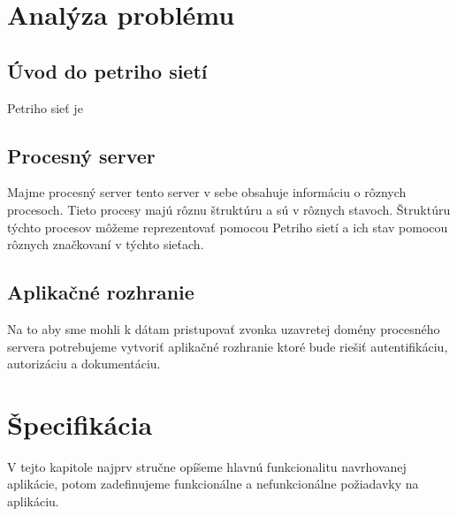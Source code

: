  

  

\section{Analýza problému} 

  

\subsection{Úvod do petriho sietí} %

\noindent Petriho sieť je  


  

  

\subsection{Procesný server} 

\noindent Majme procesný server tento server v sebe obsahuje informáciu o rôznych procesoch. Tieto procesy majú rôznu štruktúru a sú v rôznych stavoch. Štruktúru týchto procesov môžeme reprezentovať pomocou Petriho sietí a ich stav pomocou rôznych značkovaní v týchto sieťach.  


  

\subsection{Aplikačné rozhranie} 

\noindent Na to aby sme mohli k dátam pristupovať zvonka uzavretej domény procesného servera potrebujeme vytvoriť aplikačné rozhranie ktoré bude riešiť autentifikáciu, autorizáciu a dokumentáciu.  


  

  

  

  

\section{Špecifikácia} 

\noindent V tejto kapitole najprv stručne opíšeme hlavnú funkcionalitu navrhovanej aplikácie, potom zadefinujeme funkcionálne a nefunkcionálne požiadavky na aplikáciu. 

